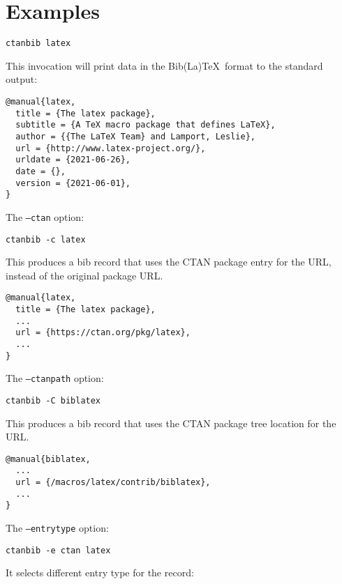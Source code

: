 \documentclass[11pt]{ltxdoc}
\begin{document}
\section{Examples}

\begin{verbatim}
ctanbib latex  
\end{verbatim}


\noindent This invocation will print data in the Bib(La)\TeX\ format to the standard output:

\begin{verbatim}
@manual{latex,
  title = {The latex package},
  subtitle = {A TeX macro package that defines LaTeX},
  author = {{The LaTeX Team} and Lamport, Leslie},
  url = {http://www.latex-project.org/},
  urldate = {2021-06-26},
  date = {},
  version = {2021-06-01},
}
\end{verbatim}

\noindent The \texttt{--ctan} option:

\begin{verbatim}
ctanbib -c latex
\end{verbatim}

\noindent This produces a bib record that uses the CTAN package entry for the URL, 
instead of the original package URL.


\begin{verbatim}
@manual{latex,
  title = {The latex package},
  ...
  url = {https://ctan.org/pkg/latex},
  ...
}
\end{verbatim}

\noindent The \texttt{--ctanpath} option:

\begin{verbatim}
ctanbib -C biblatex
\end{verbatim}

\noindent This produces a bib record that uses the CTAN package tree location for the URL.

\begin{verbatim}
@manual{biblatex,
  ...
  url = {/macros/latex/contrib/biblatex},
  ...
}
\end{verbatim}



\noindent The \texttt{--entrytype} option:

\begin{verbatim}
ctanbib -e ctan latex
\end{verbatim}

\noindent It selects different entry type for the record:
\end{document}

